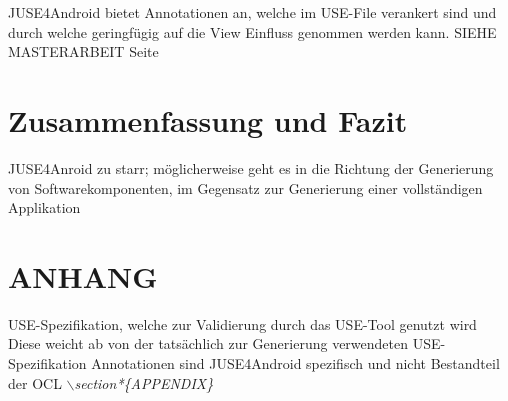 \documentclass[a4paper,twoside]{article}
\begin{document}
JUSE4Android bietet Annotationen an, welche im USE-File verankert sind und durch welche geringfügig auf die View Einfluss genommen werden kann. SIEHE MASTERARBEIT Seite


\section{Zusammenfassung und Fazit}
JUSE4Anroid zu starr; möglicherweise geht es in die Richtung der Generierung von Softwarekomponenten, im Gegensatz zur Generierung einer vollständigen Applikation
\vfill

{\small
}

\section*{\uppercase{Anhang}}

\noindent 
USE-Spezifikation, welche zur Validierung durch das USE-Tool genutzt wird 
Diese weicht ab von der tatsächlich zur Generierung verwendeten USE-Spezifikation 
 Annotationen sind JUSE4Android spezifisch und nicht Bestandteil der OCL
\textit{$\backslash$section*\{APPENDIX\}}


\vfill
\end{document}
